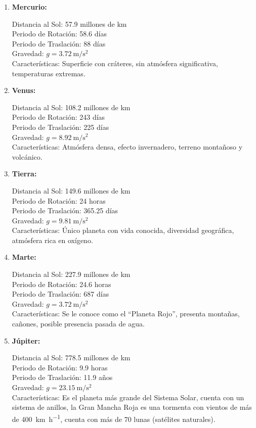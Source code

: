 \documentclass[14pt]{extarticle}
\begin{document}
\begin{enumerate}
\item \textbf{Mercurio:}

Distancia al Sol: 57.9 millones de \unit{\kilo\meter} \\
Periodo de Rotación: 58.6 días \\
Periodo de Traslación: 88 días \\
Gravedad: $g = \SI{3.72}{\meter\per\square\second}$ \\
Características: Superficie con cráteres, sin atmósfera significativa, temperaturas extremas.

\item \textbf{Venus:}

Distancia al Sol: 108.2 millones de \unit{\kilo\meter} \\
Periodo de Rotación: 243 días \\
Periodo de Traslación: 225 días \\ 
Gravedad: $g = \SI{8.92}{\meter\per\square\second}$ \\
Características: Atmósfera densa, efecto invernadero, terreno montañoso y volcánico.

\item \textbf{Tierra:}

Distancia al Sol: 149.6 millones de \unit{\kilo\meter} \\
Periodo de Rotación: 24 horas \\
Periodo de Traslación: 365.25 días \\
Gravedad: $g = \SI{9.81}{\meter\per\square\second}$ \\
Características: Único planeta con vida conocida, diversidad geográfica, atmósfera rica en oxígeno.

\item \textbf{Marte:} 

Distancia al Sol: 227.9 millones de \unit{\kilo\meter} \\
Periodo de Rotación: 24.6 horas \\
Periodo de Traslación: 687 días \\
Gravedad: $g = \SI{3.72}{\meter\per\square\second}$ \\
Características: Se le conoce como el \enquote{Planeta Rojo}, presenta montañas, cañones, posible presencia pasada de agua.

\item \textbf{Júpiter:}

Distancia al Sol: 778.5 millones de \unit{\kilo\meter} \\
Periodo de Rotación: 9.9 horas \\ 
Periodo de Traslación: 11.9 años \\
Gravedad: $g = \SI{23.15}{\meter\per\square\second}$ \\
Características: Es el planeta más grande del Sistema Solar, cuenta con un sistema de anillos, la Gran Mancha Roja es una tormenta con vientos de más de \SI{400}{\kilo\meter\per\hour}, cuenta con más de 70 lunas (satélites naturales).


\end{enumerate}
\end{document}
